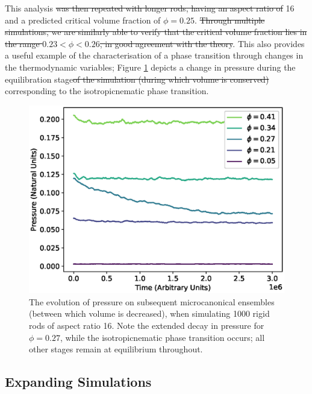\documentclass[11pt, a4paper]{article} %
\providecommand{\DIFadd}[1]{{\protect\color{blue}\uwave{#1}}} %
\providecommand{\DIFdel}[1]{{\protect\color{red}\sout{#1}}}                      %
\providecommand{\DIFaddbegin}{} %
\providecommand{\DIFaddend}{} %
\providecommand{\DIFdelbegin}{} %
\providecommand{\DIFdelend}{} %
\begin{document}
This analysis \DIFdelbegin \DIFdel{was then repeated with longer rods, having an aspect ratio of }\DIFdelend \DIFaddbegin \DIFadd{\textcolor{forestgreen}{was repeated for longer rods with an aspect ratio of} }\DIFaddend \num{16} and a predicted critical volume fraction of $\phi  = 0.25$. \DIFdelbegin \DIFdel{Through multiple simulations, we are similarly able to verify that the critical volume fraction lies in the range $0.23 < \phi< 0.26$, in good agreement with the theory}\DIFdelend \DIFaddbegin \DIFadd{\textcolor{forestgreen}{My simulations verified that the critical volume fraction lies in the range $0.23 < \phi< 0.26$, in good agreement with theory}}\DIFaddend . This also provides a useful example of the characterisation of a phase transition through changes in the thermodynamic variables; Figure \ref{fig:rr_pressureevo} depicts a change in pressure during the equilibration stage\DIFdelbegin \DIFdel{of the simulation (during which volume is conserved) }\DIFdelend \DIFaddbegin \DIFadd{, }\DIFaddend corresponding to the isotropic\textendash nematic phase transition.

\begin{figure} [h!]
	\centering
	\includegraphics[width=0.7\linewidth]{Figures/rigidrod_pressureevo}
	\caption{The evolution of pressure on subsequent microcanonical ensembles (between which volume is decreased), when simulating 1000 rigid rods of aspect ratio 16. Note the extended decay in pressure for $\phi  = 0.27$, while the isotropic\textendash nematic phase transition occurs; all other stages remain at equilibrium throughout.}
	\label{fig:rr_pressureevo}
\end{figure} %



\subsection{Expanding Simulations}
\end{document}
